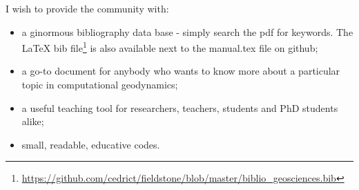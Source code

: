 
I wish to provide the community with:
\begin{itemize}
\item a ginormous bibliography data base - simply search the pdf for keywords. The \LaTeX{} bib
 file\footnote{\url{https://github.com/cedrict/fieldstone/blob/master/biblio_geosciences.bib}} 
is also available next to the manual.tex file on github;  
\item a go-to document for anybody who wants to know more about 
      a particular topic in computational geodynamics;
\item a useful teaching tool for researchers, teachers, students and PhD students alike; 
\item small, readable, educative codes. 
\end{itemize}

